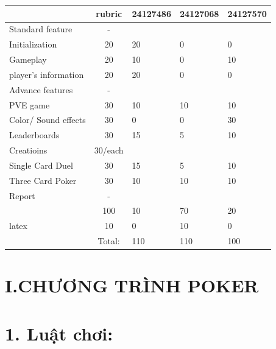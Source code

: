 \documentclass{article}
\begin{document}
\begin{table}[!ht]
    \centering
    \begin{tabular}{|l|c|l|l|l|}
    \hline
        ~ & rubric & 24127486 & 24127068 & 24127570 \\ \hline
        Standard feature & - & ~ & ~ & ~ \\ \hline
        Initialization & 20 & 20 & 0 & 0 \\ \hline
        Gameplay & 20 & 10 & 0 & 10 \\ \hline
        player's information & 20 & 20 & 0 & 0 \\ \hline
        Advance features & - & ~ & ~ & ~ \\ \hline
        PVE game & 30 & 10 & 10 & 10 \\ \hline
        Color/ Sound effects & 30 & 0 & 0 & 30 \\ \hline
        Leaderboards & 30 & 15 & 5 & 10 \\ \hline
        Creatioins & 30/each & ~ & ~ & ~ \\ \hline
        Single Card Duel & 30 & 15 & 5 & 10 \\ \hline
        Three Card Poker & 30 & 10 & 10 & 10 \\ \hline
        Report & - & ~ & ~ & ~ \\ \hline
        ~ & 100 & 10 & 70 & 20 \\ \hline
        latex & 10 & 0 & 10 & 0 \\ \hline
        ~ & Total: & 110 & 110 & 100 \\ \hline
    \end{tabular}
\end{table}



\newpage




\newpage
\section{I.CHƯƠNG TRÌNH POKER}

\section{1. Luật chơi: }
\end{document}
